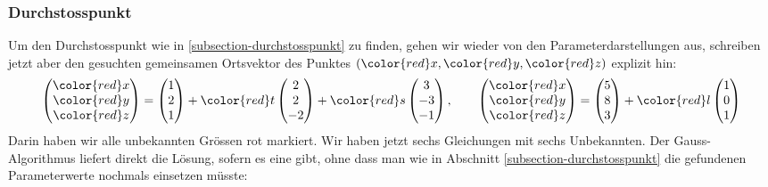 \subsubsection{Durchstosspunkt}
Um den Durchstosspunkt wie in \ref{subsection-durchstosspunkt} zu finden,
gehen wir wieder von den Parameterdarstellungen aus, schreiben jetzt
aber den gesuchten gemeinsamen Ortsvektor des Punktes
$({\color{red}x}, {\color{red}y}, {\color{red}z})$ explizit hin:
\[
\begin{pmatrix}
\color{red}x\\
\color{red}y\\
\color{red}z\\
\end{pmatrix}
=
\begin{pmatrix}1\\2\\1 \end{pmatrix}
+
{\color{red}t}\begin{pmatrix}2\\2\\-2\end{pmatrix}
+
{\color{red}s}\begin{pmatrix}3\\-3\\-1\end{pmatrix}
,\qquad
\begin{pmatrix}
\color{red}x\\
\color{red}y\\
\color{red}z\\
\end{pmatrix}
=
\begin{pmatrix} 5\\8\\3 \end{pmatrix}
+
{\color{red}l}\begin{pmatrix} 1\\0\\1 \end{pmatrix}
\]
Darin haben wir alle unbekannten Grössen {\color{red}rot} markiert.
Wir haben jetzt sechs Gleichungen mit sechs Unbekannten.
Der Gauss-Algorithmus liefert direkt die Lösung, sofern es eine gibt,
ohne dass man wie in Abschnitt \ref{subsection-durchstosspunkt}
die gefundenen Parameterwerte nochmals einsetzen müsste:

